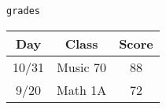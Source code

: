 \begin{center}
\lstinline{grades}

\begin{tabular}{|c|c|c|}
 \hline
 \textbf{Day} & \textbf{Class} & \textbf{Score} \\
 \hline
 10/31 & Music 70 & 88 \\
 \hline
 9/20 & Math 1A & 72 \\
 \hline
\end{tabular}
\end{center}